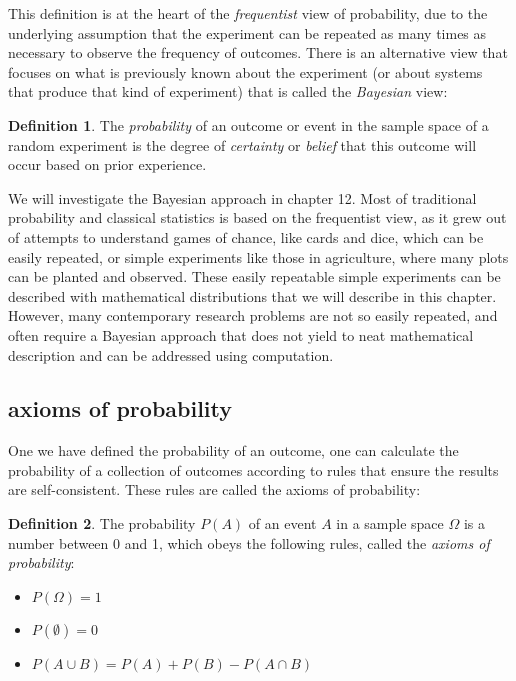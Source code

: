 \documentclass[
]{book}
\providecommand{\tightlist}{%
  \setlength{\itemsep}{0pt}\setlength{\parskip}{0pt}}
\theoremstyle{definition}
\newtheorem{definition}{Definition}[chapter]
\theoremstyle{definition}
\theoremstyle{definition}
\theoremstyle{remark}
\begin{document}
This definition is at the heart of the \emph{frequentist} view of probability, due to the underlying assumption that the experiment can be repeated as many times as necessary to observe the frequency of outcomes. There is an alternative view that focuses on what is previously known about the experiment (or about systems that produce that kind of experiment) that is called the \emph{Bayesian} view:

\begin{definition}
\protect\hypertarget{def:def-prob-bayes}{}{\label{def:def-prob-bayes} }The \emph{probability} of an outcome or event in the sample space of a random experiment is the degree of \emph{certainty} or \emph{belief} that this outcome will occur based on prior experience.
\end{definition}

We will investigate the Bayesian approach in chapter 12. Most of traditional probability and classical statistics is based on the frequentist view, as it grew out of attempts to understand games of chance, like cards and dice, which can be easily repeated, or simple experiments like those in agriculture, where many plots can be planted and observed. These easily repeatable simple experiments can be described with mathematical distributions that we will describe in this chapter. However, many contemporary research problems are not so easily repeated, and often require a Bayesian approach that does not yield to neat mathematical description and can be addressed using computation.

\hypertarget{axioms-of-probability}{%
\subsection{axioms of probability}\label{axioms-of-probability}}

One we have defined the probability of an outcome, one can calculate the probability of a collection of outcomes according to rules that ensure the results are self-consistent. These rules are called the axioms of probability:

\begin{definition}
\protect\hypertarget{def:def-prob-axioms}{}{\label{def:def-prob-axioms} }The probability \(P(A)\) of an event \(A\) in a sample space \(\Omega\) is a number between 0 and 1, which obeys the following rules, called the \emph{axioms of probability}:

\begin{itemize}
\tightlist
\item
  \(P(\Omega) = 1\)
\item
  \(P(\emptyset) = 0\)
\item
  \(P(A \cup B) = P(A) + P(B) - P(A \cap B)\)
\end{itemize}
\end{definition}
\end{document}

